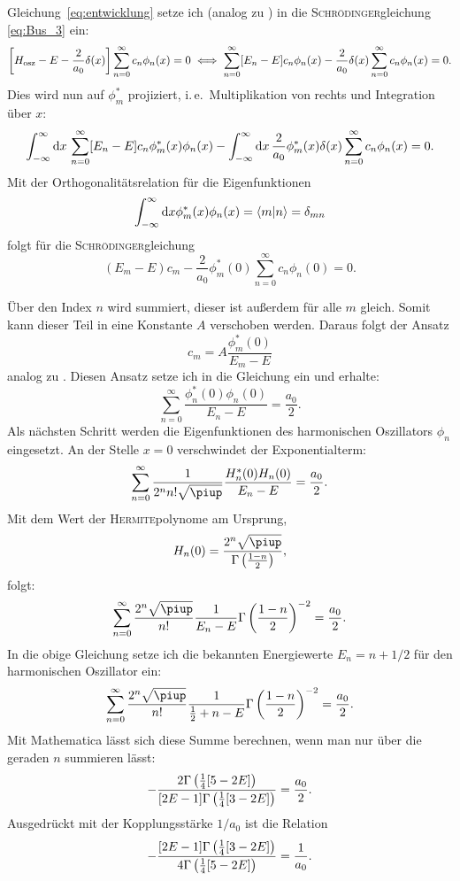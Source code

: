 Gleichung~\eqref{eq:entwicklung} setze ich (analog zu ) in die
\textsc{Schrödinger}gleichung \eqref{eq:Bus_3} ein:
\[
    \sbr{H_\text{osz} - E - \frac2{a_0} \delta(x)}
    \sum_{n=0}^\infty c_n \phi_n(x)
    = 0
    \iff
    \sum_{n=0}^\infty [E_n - E] c_n \phi_n(x)
    - \frac2{a_0} \delta(x)
    \sum_{n=0}^\infty c_n \phi_n(x)
    = 0.
\]
Dies wird nun auf $\phi_m^*$ projiziert, i.\,e.\ Multiplikation von rechts und
Integration über $x$:
\[
    \int_{-\infty}^\infty \dif x \, \sum_{n=0}^\infty
    [E_n - E] c_n \phi_m^*(x) \phi_n(x)
    -
    \int_{-\infty}^\infty \dif x \,  \frac2{a_0} \phi_m^*(x) \delta(x)
    \sum_{n=0}^\infty c_n \phi_n(x) = 0.
\]
Mit der Orthogonalitätsrelation für die Eigenfunktionen
\[
    \int_{-\infty}^\infty \dif x \phi_m^*(x) \phi_n(x) = \braket{m|n} =
    \delta_{mn}
\]
folgt für die \textsc{Schrödinger}gleichung
\[
    (E_m - E) c_m - \frac2{a_0} \phi_m^*(0) \sum_{n=0}^\infty c_n \phi_n(0) =
    0.
\]

Über den Index $n$ wird summiert, dieser ist außerdem für alle $m$ gleich.
Somit kann dieser Teil in eine Konstante $A$ verschoben werden. Daraus folgt
der Ansatz
\[
    c_m = A \frac{\phi_m^*(0)}{E_m - E}
\]
analog zu . Diesen Ansatz setze ich in die Gleichung ein und erhalte:
\[
    \sum_{n=0}^\infty \frac{\phi_n^*(0) \phi_n(0)}{E_n - E} = \frac{a_0}2.
\]
Als nächsten Schritt werden die Eigenfunktionen des harmonischen Oszillators
$\phi_n$ eingesetzt. An der Stelle $x = 0$ verschwindet der Exponentialterm:
\[
    \sum_{n=0}^\infty \frac{1}{2^n n! \sqrt\piup} \frac{H_n^*(0) H_n(0)}{E_n -
    E} = \frac{a_0}2.
\]
Mit dem Wert der \textsc{Hermite}polynome am Ursprung,
\[
    H_n(0) = \frac{2^n \sqrt\piup}{\Gamma\del{\frac{1-n}2}},
\]
folgt:
\[
    \sum_{n=0}^\infty \frac{2^n \sqrt\piup}{n!} \frac{1}{E_n -
    E} \Gamma\del{\frac{1-n}2}^{-2} = \frac{a_0}2.
\]
In die obige Gleichung setze ich die bekannten Energiewerte $E_n = n + 1/2$ für
den harmonischen Oszillator ein:
\[
    \sum_{n=0}^\infty \frac{2^n \sqrt\piup}{n!} \frac{1}{\frac 12 + n -
    E} \Gamma\del{\frac{1-n}2}^{-2} = \frac{a_0}2.
\]
Mit Mathematica lässt sich diese Summe berechnen, wenn man nur über die geraden
$n$ summieren lässt:
\[
    - \frac{2 \Gamma\del{\frac 14[5-2E]}}{[2E-1]\Gamma\del{\frac 14[3-2E]}}
    = \frac{a_0}2.
\]
Ausgedrückt mit der Kopplungsstärke $1/a_0$ ist die Relation
\begin{equation}
    \label{eq:Energie-Delta}
    - \frac{[2E-1]\Gamma\del{\frac 14[3-2E]}}{4 \Gamma\del{\frac 14[5-2E]}}
    = \frac1{a_0}.
\end{equation}


